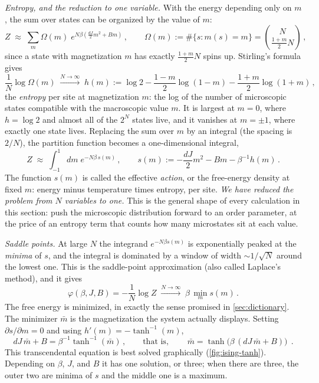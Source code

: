 \documentclass[11pt]{article}
\newcommand{\pd}{\partial}
\begin{document}
\emph{Entropy, and the reduction to one variable.} With the energy depending only on $m$, the sum over states can be organized by the value of $m$:
%
\begin{equation}
    Z \;\approx\; \sum_{m} \Omega(m)\; e^{N\beta\left(\frac{dJ}{2}m^2 + Bm\right)}\,,\qquad \Omega(m) := \#\{s : m(s) = m\} = \binom{N}{\frac{1+m}{2}N}\,,
\end{equation}
%
since a state with magnetization $m$ has exactly $\frac{1+m}{2}N$ spins up. Stirling's formula gives
%
\begin{equation}
    \frac{1}{N}\log\Omega(m) \;\xrightarrow{N\to\infty}\; h(m) := \log 2 - \frac{1-m}{2}\log(1-m) - \frac{1+m}{2}\log(1+m)\,, \label{ising-entropy}
\end{equation}
%
the \emph{entropy} per site at magnetization $m$: the log of the number of microscopic states compatible with the macroscopic value $m$. It is largest at $m=0$, where $h = \log 2$ and almost all of the $2^N$ states live, and it vanishes at $m=\pm1$, where exactly one state lives. Replacing the sum over $m$ by an integral (the spacing is $2/N$), the partition function becomes a one-dimensional integral,
%
\begin{equation}
    Z \;\approx\; \int_{-1}^{1} dm\; e^{-N\beta\, s(m)}\,,\qquad
    s(m) := -\frac{dJ}{2}m^2 - Bm - \beta^{-1}h(m)\,. \label{ising-action}
\end{equation}
%
The function $s(m)$ is called the effective \emph{action}, or the free-energy density at fixed $m$: energy minus temperature times entropy, per site. \emph{We have reduced the problem from $N$ variables to one.} This is the general shape of every calculation in this section: push the microscopic distribution forward to an order parameter, at the price of an entropy term that counts how many microstates sit at each value.

\emph{Saddle points.} At large $N$ the integrand $e^{-N\beta s(m)}$ is exponentially peaked at the \emph{minima} of $s$, and the integral is dominated by a window of width $\sim 1/\sqrt{N}$ around the lowest one. This is the saddle-point approximation (also called Laplace's method), and it gives
%
\begin{equation}
    \varphi(\beta,J,B) = -\frac{1}{N}\log Z \;\xrightarrow{N\to\infty}\; \beta\,\min_m s(m)\,. \label{ising-saddle}
\end{equation}
%
The free energy is minimized, in exactly the sense promised in \cref{sec:dictionary}. The minimizer $\bar m$ is the magnetization the system actually displays. Setting $\pd s/\pd m = 0$ and using $h'(m) = -\tanh^{-1}(m)$,
%
\begin{equation}
    dJ\,\bar m + B = \beta^{-1}\tanh^{-1}(\bar m)\,,\qquad\text{that is,}\qquad \boxed{\;\bar m = \tanh\big(\beta\,(dJ\,\bar m + B)\big)\;}\,. \label{ising-sc}
\end{equation}
%
This transcendental equation is best solved graphically (\cref{fig:ising-tanh}). Depending on $\beta$, $J$, and $B$ it has one solution, or three; when there are three, the outer two are minima of $s$ and the middle one is a maximum.
\end{document}
